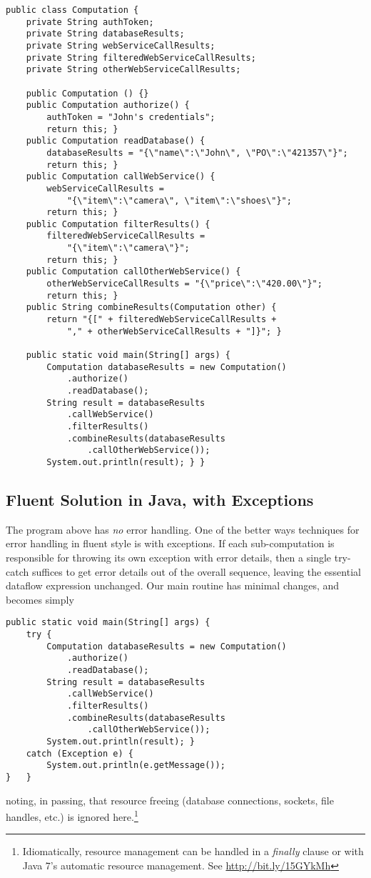 \documentclass[11pt]{article}
\begin{document}
\begin{verbatim}
public class Computation {
    private String authToken;
    private String databaseResults;
    private String webServiceCallResults;
    private String filteredWebServiceCallResults;
    private String otherWebServiceCallResults;

    public Computation () {}
    public Computation authorize() {
        authToken = "John's credentials";
        return this; }
    public Computation readDatabase() {
        databaseResults = "{\"name\":\"John\", \"PO\":\"421357\"}";
        return this; }
    public Computation callWebService() {
        webServiceCallResults =
            "{\"item\":\"camera\", \"item\":\"shoes\"}";
        return this; }
    public Computation filterResults() {
        filteredWebServiceCallResults =
            "{\"item\":\"camera\"}";
        return this; }
    public Computation callOtherWebService() {
        otherWebServiceCallResults = "{\"price\":\"420.00\"}";
        return this; }
    public String combineResults(Computation other) {
        return "{[" + filteredWebServiceCallResults +
            "," + otherWebServiceCallResults + "]}"; }

    public static void main(String[] args) {
        Computation databaseResults = new Computation()
            .authorize()
            .readDatabase();
        String result = databaseResults
            .callWebService()
            .filterResults()
            .combineResults(databaseResults
                .callOtherWebService());
        System.out.println(result); } }
\end{verbatim}
\subsection{Fluent Solution in Java, with Exceptions}
\label{sec-2-2}

The program above has \emph{no} error handling. One of the better ways
techniques for error handling in fluent style is with exceptions.
If each sub-computation is responsible for throwing its own
exception with error details, then a single try-catch suffices to
get error details out of the overall sequence, leaving the
essential dataflow expression unchanged. Our main routine has
minimal changes, and becomes simply

\begin{verbatim}
public static void main(String[] args) {
    try {
        Computation databaseResults = new Computation()
            .authorize()
            .readDatabase();
        String result = databaseResults
            .callWebService()
            .filterResults()
            .combineResults(databaseResults
                .callOtherWebService());
        System.out.println(result); }
    catch (Exception e) {
        System.out.println(e.getMessage());
}   }
\end{verbatim}
noting, in passing, that resource freeing (database connections,
sockets, file handles, etc.) is ignored here.\footnote{Idiomatically,
   resource management can be handled in a \emph{finally} clause or with
   Java 7's automatic resource management. See \url{http://bit.ly/15GYkMh}}
\end{document}
